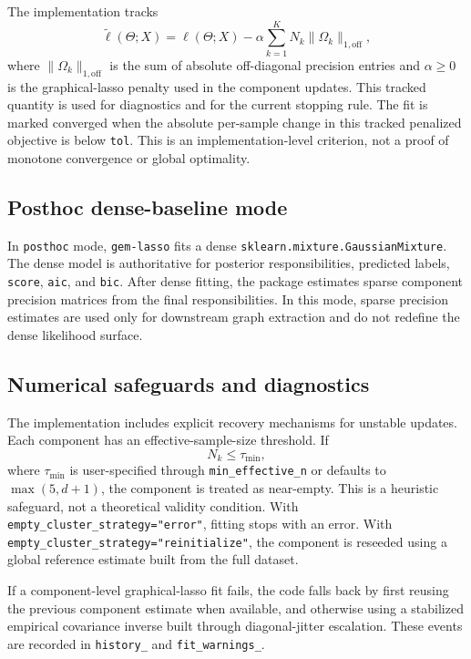 \documentclass[10pt]{article}
\begin{document}
The implementation tracks
\[
\widetilde{\ell}(\Theta;X)
=
\ell(\Theta;X)
-
\alpha
\sum_{k=1}^K
N_k
\|\Omega_k\|_{1,\mathrm{off}},
\]
where $\|\Omega_k\|_{1,\mathrm{off}}$ is the sum of absolute off-diagonal
precision entries and $\alpha\ge 0$ is the graphical-lasso penalty used in the
component updates. This tracked quantity is used for diagnostics and for the
current stopping rule. The fit is marked converged when the absolute per-sample
change in this tracked penalized objective is below \texttt{tol}. This is an
implementation-level criterion, not a proof of monotone convergence or global
optimality.


\subsection{Posthoc dense-baseline mode}

In \texttt{posthoc} mode, \texttt{gem-lasso} fits a dense
\texttt{sklearn.mixture.GaussianMixture}. The dense model is authoritative for
posterior responsibilities, predicted labels, \texttt{score}, \texttt{aic}, and
\texttt{bic}. After dense fitting, the package estimates sparse component
precision matrices from the final responsibilities. In this mode, sparse
precision estimates are used only for downstream graph extraction and do not
redefine the dense likelihood surface.

\subsection{Numerical safeguards and diagnostics}

The implementation includes explicit recovery mechanisms for unstable updates.
Each component has an effective-sample-size threshold. If
\[
N_k \le \tau_{\min},
\]
where $\tau_{\min}$ is user-specified through \texttt{min\_effective\_n} or
defaults to $\max(5,d+1)$, the component is treated as near-empty. This is a
heuristic safeguard, not a theoretical validity condition. With
\texttt{empty\_cluster\_strategy="error"}, fitting stops with an error. With
\texttt{empty\_cluster\_strategy="reinitialize"}, the component is reseeded
using a global reference estimate built from the full dataset.

If a component-level graphical-lasso fit fails, the code falls back by first
reusing the previous component estimate when available, and otherwise using a
stabilized empirical covariance inverse built through diagonal-jitter
escalation. These events are recorded in \texttt{history\_} and
\texttt{fit\_warnings\_}.
\end{document}
